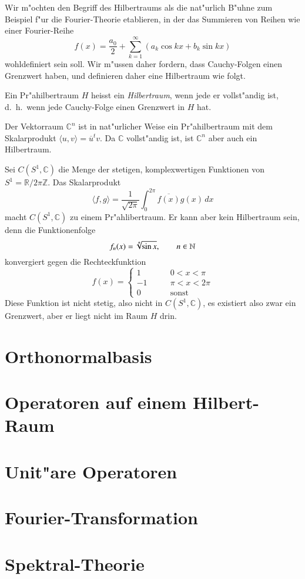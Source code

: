 Wir m"ochten den Begriff des Hilbertraums als die nat"urlich B"uhne zum
Beispiel f"ur die Fourier-Theorie etablieren, in der das Summieren von
Reihen wie einer Fourier-Reihe
\[
f(x) = \frac{a_0}2+\sum_{k=1}^\infty (a_k\cos kx+b_k\sin kx)
\]
wohldefiniert sein soll.
Wir m"ussen daher fordern, dass Cauchy-Folgen einen Grenzwert haben,
und definieren daher eine Hilbertraum wie folgt.

\begin{definition}
Ein Pr"ahilbertraum $H$ heisst ein {\em Hilbertraum}, wenn jede er 
vollst"andig ist, d.~h.~wenn jede Cauchy-Folge einen Grenzwert in $H$ hat.
\end{definition}

\begin{beispiel}
Der Vektorraum $\mathbb C^n$ ist in nat"urlicher Weise ein Pr"ahilbertraum
mit dem Skalarprodukt $\langle u,v\rangle = \overline{u}^t v$.
Da $\mathbb C$ vollst"andig ist, ist $\mathbb C^n$ aber auch ein
Hilbertraum.
\end{beispiel}

\begin{beispiel}
Sei $C(S^1, \mathbb C)$ die Menge der stetigen, komplexwertigen Funktionen 
von $S^1 = \mathbb R/2\pi\mathbb Z$.
Das Skalarprodukt
\[
\langle f,g\rangle = \frac1{\sqrt{2\pi}}\int_0^{2\pi} \overline{f(x)} g(x)\,dx
\]
macht $C(S^1,\mathbb C)$ zu einem Pr"ahlibertraum.
Er kann aber kein Hilbertraum sein, denn die Funktionenfolge
\[
f_n(x)=\root{n}\of{\sin x},\qquad n\in\mathbb N
\]
konvergiert gegen die Rechteckfunktion
\[
f(x)=\begin{cases}
1&\qquad 0<x<\pi\\
-1&\qquad \pi<x<2\pi\\
0&\qquad\text{sonst}
\end{cases}
\]
Diese Funktion ist nicht stetig, also nicht in $C(S^1,\mathbb C)$, es existiert
also zwar ein Grenzwert, aber er liegt nicht im Raum $H$ drin.
\end{beispiel}

\section{Orthonormalbasis}

\section{Operatoren auf einem Hilbert-Raum}

\section{Unit"are Operatoren}

\section{Fourier-Transformation}

\section{Spektral-Theorie}




